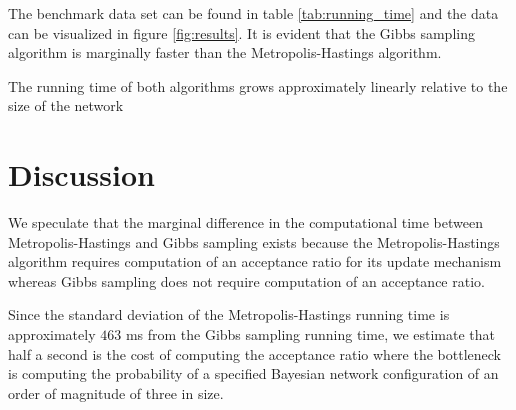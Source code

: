 \documentclass{sig-alternate}
\begin{document}
The benchmark data set can be found in table \ref{tab:running_time} and
the data can be visualized in figure \ref{fig:results}. It is evident that
the Gibbs sampling algorithm is marginally faster than the
Metropolis-Hastings algorithm.

The running time of both algorithms grows approximately linearly relative
to the size of the network


\section{Discussion} %
\label{sec:Discussion}
	We speculate that the marginal difference in the computational time
	between Metropolis-Hastings and Gibbs sampling exists because the
	Metropolis-Hastings algorithm requires computation of an acceptance ratio
	for its update mechanism whereas Gibbs sampling does not require
	computation of an acceptance ratio.
	
	Since the standard deviation of the Metropolis-Hastings running time
	is approximately $463$ ms from the Gibbs sampling running time,
	we estimate that half a second is the cost of computing the acceptance
	ratio where the bottleneck is computing the probability of a specified
	Bayesian network configuration of an order of magnitude of three in
	size.



\end{document}
